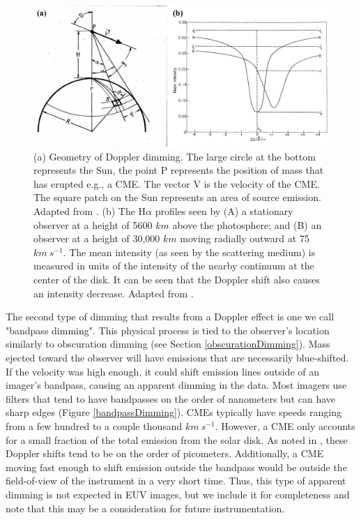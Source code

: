 \begin{figure}[!h]
    \caption[Geometry and effect of Doppler dimming]{
        (a) Geometry of Doppler dimming. The large circle at the bottom represents the Sun, the point P represents the 
        position of mass that has erupted e.g., a CME. The vector V is the velocity of the CME. The square patch on the Sun
        represents an area of source emission. Adapted from \citet{Rompolt1967a}. (b) The H$\alpha$ profiles seen by (A)  a 
        stationary observer at a height of 5600 $km$ above the photosphere; and (B) an observer at a height of 30,000 $km$ 
        moving radially outward at 75 $km\ s^{-1}$. The mean intensity (as seen by the scattering medium) is measured in 
        units of the intensity of the nearby continuum at the center of the disk. It can be seen that the Doppler shift 
        also causes an intensity decrease. Adapted from \citet{Hyder1970}. 
    }
    \begin{center}
        \includegraphics[width=150mm]{Images/DopplerDimming.png}
    \end{center}
    \label{dopplerDimming}
\end{figure}

The second type of dimming that results from a Doppler effect is one we call "bandpass dimming". This physical process is tied to the observer’s location similarly to obscuration dimming (see Section \ref{obscurationDimming}). Mass ejected toward the observer will have emissions that are necessarily blue-shifted. If the velocity was high enough, it could shift emission lines outside of an imager's bandpass, causing an apparent dimming in the data. Most imagers use filters that tend to have bandpasses on the order of nanometers but can have sharp edges (Figure \ref{bandpassDimming}). CMEs typically have speeds ranging from a few hundred to a couple thousand $km\ s^{-1}$. However, a CME only accounts for a small fraction of the total emission from the solar disk. As noted in \citet{Hudson2011}, these Doppler shifts tend to be on the order of picometers. Additionally, a CME moving fast enough to shift emission outside the bandpass would be outside the field-of-view of the instrument in a very short time. Thus, this type of apparent dimming is not expected in EUV images, but we include it for completeness and note that this may be a consideration for future instrumentation. 

